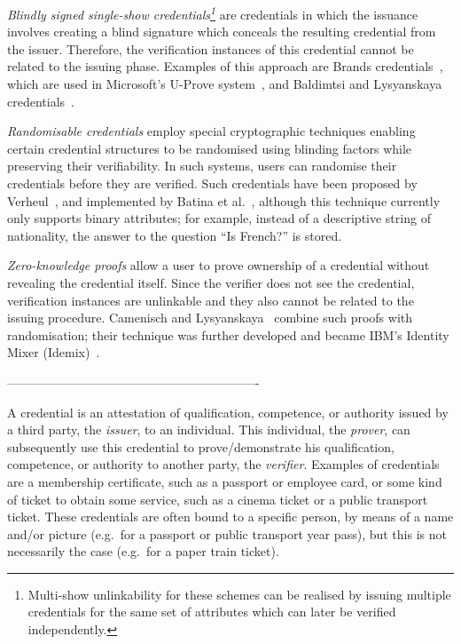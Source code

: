 \label{unlinkApproaches}
\emph{Blindly signed single-show credentials\footnote{Multi-show unlinkability
for these schemes can be realised by issuing multiple credentials for the same
set of attributes which can later be verified independently.}} are credentials
in which the issuance involves creating a blind signature which conceals the
resulting credential from the issuer. Therefore, the verification instances of
this credential cannot be related to the issuing phase. Examples of this
approach are Brands credentials~\cite{Brands2000}, which are used in
Microsoft's U-Prove system~\cite{U-Prove_Crypto2011}, and Baldimtsi and
Lysyanskaya credentials~\cite{BaLy2012}.

\emph{Randomisable credentials} employ special cryptographic techniques
enabling certain credential structures to be randomised using blinding factors
while preserving their verifiability. In such systems, users can randomise their
credentials before they are verified. Such credentials have been proposed by
Verheul~\cite{Verheul01}, and implemented by Batina et
al.~\cite{BatinaHJMV10}, although this technique currently only supports binary
attributes; for example, instead of a descriptive string of nationality, the
answer to the question ``Is French?'' is stored.

\emph{Zero-knowledge proofs} allow a user to prove ownership of a credential
without revealing the credential itself. Since the verifier does not see the
credential, verification instances are unlinkable and they also cannot be
related to the issuing procedure. Camenisch and
Lysyanskaya~\cite{CamenischLysyanskaya2001,CamenischLysyanskaya2003} combine such proofs with randomisation; their
technique was further developed and became IBM's Identity Mixer
(Idemix)~\cite{IdemixCrypto2012}.


-------------------------------------------------------------

A credential is an attestation of qualification, competence, or authority
issued by a third party, the \emph{issuer}, to an individual. This
individual, the \emph{prover}, can subsequently use this credential to
prove\slash demonstrate his qualification, competence, or authority to
another party, the \emph{verifier}. Examples of credentials are a
membership certificate, such as a passport or employee card, or some kind
of ticket to obtain some service, such as a cinema ticket or a public
transport ticket. These credentials are often bound to a specific person,
by means of a name and\slash or picture (e.g.\ for a passport or public
transport year pass), but this is not necessarily the case (e.g.\ for a
paper train ticket).

